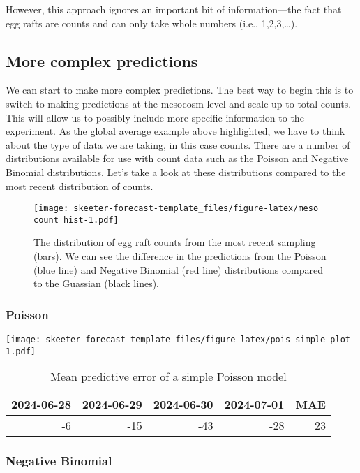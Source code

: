 \documentclass[
]{article}
\begin{document}
However, this approach ignores an important bit of information---the
fact that egg rafts are counts and can only take whole numbers (i.e.,
1,2,3,\ldots).

\subsection{More complex predictions}\label{more-complex-predictions}

We can start to make more complex predictions. The best way to begin
this is to switch to making predictions at the mesocosm-level and scale
up to total counts. This will allow us to possibly include more specific
information to the experiment. As the global average example above
highlighted, we have to think about the type of data we are taking, in
this case counts. There are a number of distributions available for use
with count data such as the Poisson and Negative Binomial distributions.
Let's take a look at these distributions compared to the most recent
distribution of counts.

\begin{figure}
\centering
\texttt{[image: skeeter-forecast-template\_files/figure-latex/meso count hist-1.pdf]}
\caption{The distribution of egg raft counts from the most recent
sampling (bars). We can see the difference in the predictions from the
Poisson (blue line) and Negative Binomial (red line) distributions
compared to the Guassian (black lines).}
\end{figure}

\subsubsection{Poisson}\label{poisson}

\texttt{[image: skeeter-forecast-template\_files/figure-latex/pois simple plot-1.pdf]}

\begin{longtable}[t]{rrrrr}
\caption{\label{tab:pois simple accuracy}Mean predictive error of a simple Poisson model}\\
\toprule
2024-06-28 & 2024-06-29 & 2024-06-30 & 2024-07-01 & MAE\\
\midrule
-6 & -15 & -43 & -28 & 23\\
\bottomrule
\end{longtable}

\subsubsection{Negative Binomial}\label{negative-binomial}
\end{document}
